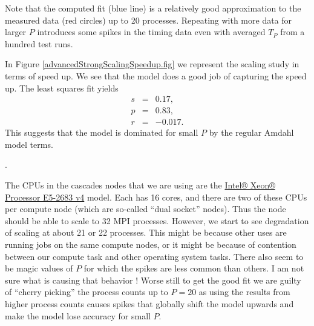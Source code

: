 Note that the computed fit (blue line) is a relatively good approximation to the measured data (red circles) up to 20 processes. Repeating with more data for larger $P$ introduces some spikes in the timing data even with averaged $T_P$ from a hundred test runs.

In Figure \ref{advancedStrongScalingSpeedup.fig} we represent the scaling study in terms of speed up. We see that the model does a good job of capturing the speed up. The least squares fit yields
\begin{eqnarray*}
s &=& 0.17,\\
p &=& 0.83,\\
r &=&-0.017.
\end{eqnarray*}
This suggests that the model is dominated for small $P$ by the regular Amdahl model terms. 

.


The CPUs in the cascades nodes that we are using are the \href{https://ark.intel.com/content/www/us/en/ark/products/91766/intel-xeon-processor-e5-2683-v4-40m-cache-2-10-ghz.html}{Intel® Xeon® Processor E5-2683 v4} model. Each has 16 cores, and there are two of these CPUs per compute node (which are so-called ``dual socket'' nodes). Thus the node should be able to scale to 32 MPI processes. However, we start to see degradation of scaling at about 21 or 22 processes. This might be because other uses are running jobs on the same compute nodes, or it might be because of contention between our compute task and other operating system tasks. There also seem to be magic values of $P$ for which the spikes are less common than others. I am not sure what is causing that behavior ! Worse still to get the good fit we are guilty of ``cherry picking'' the process counts up to $P=20$ as using the results from higher process counts causes spikes that globally shift the model upwards and make the model lose accuracy for small $P$.




